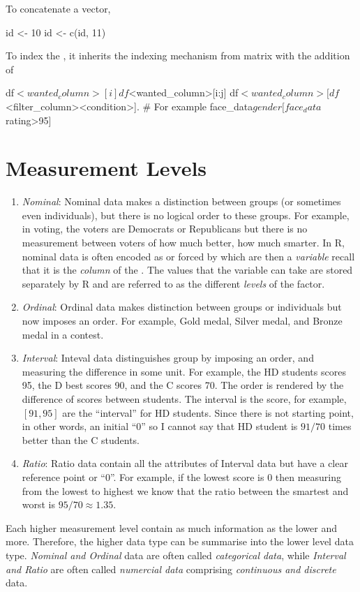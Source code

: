To concatenate a vector,
\begin{Rblock}
    id <- 10
    id <- c(id, 11)
\end{Rblock}

To index the , it inherits the indexing mechanism from matrix with the addition of
\begin{Rblock}
    df$<wanted_column>[i]
    df$<wanted_column>[i:j]
    df$<wanted_column>[df$<filter_column><condition>]. 
    # For example
    face_data$gender[face_data$rating>95]
\end{Rblock}

\section{Measurement Levels}
\begin{enumerate}
    \item \emph{Nominal}: Nominal data makes a distinction between groups (or sometimes even individuals), but there is no logical order to these groups. For example, in voting, the voters are Democrats or Republicans but there 
    is no measurement between voters of how much better, how much smarter. In R, nominal data is often encoded as  or forced by  which are then a \emph{variable} recall that it is the 
    \emph{column} of the . The values that the variable can take are stored separately by R and are referred to as the different \emph{levels} of the factor.
    \item \emph{Ordinal}: Ordinal data makes distinction between groups or individuals but now imposes an order. For example, Gold medal, Silver medal, and Bronze medal in a contest. 
    \item \emph{Interval}: Inteval data distinguishes group by imposing an order, and measuring the difference in some unit. For example, the HD students scores 95, the D best scores 90, and the C scores 70. 
    The order is rendered by the difference of scores between students. The interval is the score, for example, $[91,95]$ are the ``interval'' for HD students. Since there is not starting point, in other words, an initial
    ``0'' so I cannot say that HD student is $91/70$ times better than the C students.
    \item \emph{Ratio}: Ratio data contain all the attributes of Interval data but have a clear reference point or ``0''. For example, if the lowest score is 0 then measuring from the lowest to highest we know that the ratio 
    between the smartest and worst is $95/70\approx1.35$.
\end{enumerate}
Each higher measurement level contain as much information as the lower and more. Therefore, the higher data type can be summarise into the lower level data type. \emph{Nominal and Ordinal} data are often called
\emph{categorical data}, while \emph{Interval and Ratio} are often called \emph{numercial data} comprising \emph{continuous and discrete} data.

